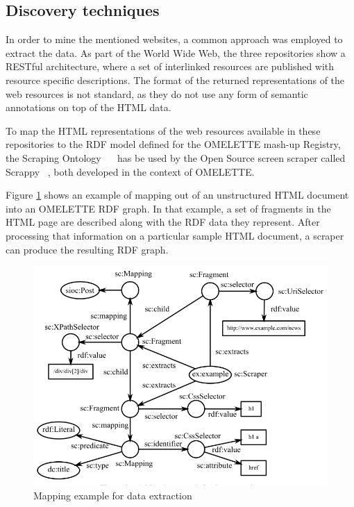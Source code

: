 \subsection{Discovery techniques}
\label{subsec:limonontology}

In order to mine the mentioned websites, a common approach was employed to extract the data. As part of the World Wide Web, the three repositories show a RESTful architecture, where a set of interlinked resources are published with resource specific descriptions. The format of the returned representations of the web resources is not standard, as they do not use any form of semantic annotations on top of the HTML data.

To map the HTML representations of the web resources available in these repositories to the RDF model defined for the OMELETTE mash-up Registry, the Scraping Ontology~\cite{fernandez2011semantic} ~\cite{scont11} has be used by the Open Source screen scraper called Scrappy ~\cite{scr11}, both developed in the context of OMELETTE.

Figure \ref{fig:mappingexample1} shows an example of mapping out of an unstructured HTML document into an OMELETTE RDF graph. In that example, a set of fragments in the HTML page are described along with the RDF data they represent. After processing that information on a particular sample HTML document, a scraper can produce the resulting RDF graph.

\begin{figure}[ht!]
\centering
\includegraphics[width=350pt]{graphics/graph1.png}
\caption{Mapping example for data extraction}
\label{fig:mappingexample1}
\end{figure}

